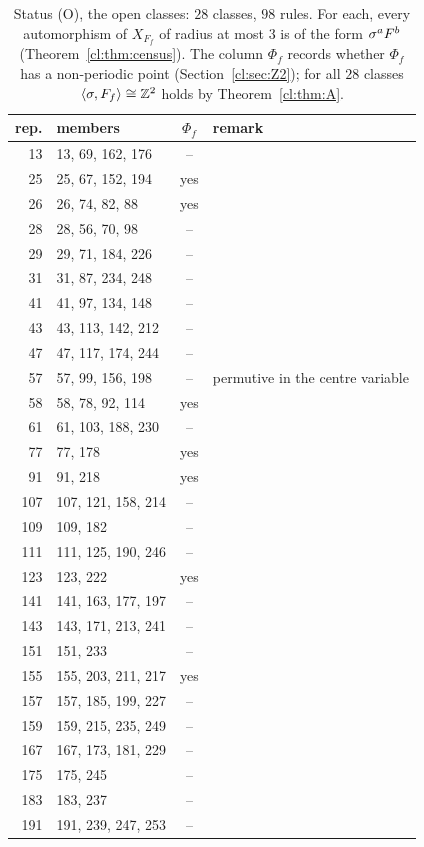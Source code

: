\begin{table}[!htbp]
\medskip
\caption{Status (O), the open classes: $28$ classes, $98$ rules. For each, every automorphism of $X_{F_f}$ of radius at most $3$ is of the form $\sigma^aF^b$ (Theorem~\ref{cl:thm:census}). The column $\Phi_f$ records whether $\Phi_f$ has a non-periodic point (Section~\ref{cl:sec:Z2}); for all $28$ classes $\langle\sigma,F_f\rangle\cong\mathbb{Z}^2$ holds by Theorem~\ref{cl:thm:A}.}
\label{cl:tab:open}
\centering\footnotesize\renewcommand{\arraystretch}{0.9}
\begin{tabular}{rlcl}
\toprule
rep. & members & $\Phi_f$ & remark\\
\midrule
13 & 13, 69, 162, 176 & -- & \\
25 & 25, 67, 152, 194 & yes & \\
26 & 26, 74, 82, 88 & yes & \\
28 & 28, 56, 70, 98 & -- & \\
29 & 29, 71, 184, 226 & -- & \\
31 & 31, 87, 234, 248 & -- & \\
41 & 41, 97, 134, 148 & -- & \\
43 & 43, 113, 142, 212 & -- & \\
47 & 47, 117, 174, 244 & -- & \\
57 & 57, 99, 156, 198 & -- & permutive in the centre variable\\
58 & 58, 78, 92, 114 & yes & \\
61 & 61, 103, 188, 230 & -- & \\
77 & 77, 178 & yes & \\
91 & 91, 218 & yes & \\
107 & 107, 121, 158, 214 & -- & \\
109 & 109, 182 & -- & \\
111 & 111, 125, 190, 246 & -- & \\
123 & 123, 222 & yes & \\
141 & 141, 163, 177, 197 & -- & \\
143 & 143, 171, 213, 241 & -- & \\
151 & 151, 233 & -- & \\
155 & 155, 203, 211, 217 & yes & \\
157 & 157, 185, 199, 227 & -- & \\
159 & 159, 215, 235, 249 & -- & \\
167 & 167, 173, 181, 229 & -- & \\
175 & 175, 245 & -- & \\
183 & 183, 237 & -- & \\
191 & 191, 239, 247, 253 & -- & \\
\bottomrule
\end{tabular}
\end{table}

